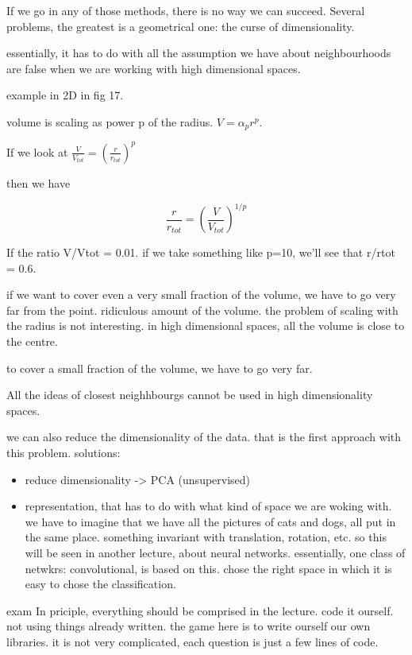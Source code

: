 \documentclass[a4paper]{tufte-book}
\begin{document}
If we go in any of those methods, there is no way we can succeed. Several
problems, the greatest is a geometrical one:
the curse of dimensionality.

essentially, it has to do with all the assumption we have about neighbourhoods
are false when we are working with high dimensional spaces.

example in 2D in fig 17.

volume is scaling as power p of the radius. $V = \alpha_p r^p$.

If we look at $\frac{V}{V_{tot}} = \left( \frac{r}{r_{tot}} \right)^p$

then we have 

\begin{equation}
    \frac{r}{r_{tot}} = \left( \frac{V}{V_{tot}} \right)^{1/p}
\end{equation}


If the ratio V/Vtot = 0.01.
if we take something like p=10, we'll see that r/rtot = 0.6.

if we want to cover even a very small fraction of the volume, we have to go very
far from the point.
ridiculous amount of the volume.
the problem of scaling with the radius is not interesting.
in high dimensional spaces, all the volume is close to the centre.

to cover a small fraction of the volume, we have to go very far.

All the ideas of closest neighhbourgs cannot be used in high dimensionality
spaces.

we can also reduce the dimensionality of the data. that is the first approach
with this problem.
solutions:
\begin{itemize}
    \item reduce dimensionality -> PCA (unsupervised)
    \item representation, that has to do with what kind of space we are woking with. we have to imagine that we have all the pictures of cats and
        dogs, all put in the same place.
        something invariant with translation, rotation, etc. so this will be seen in another lecture, about neural networks. essentially, one
        class of netwkrs: convolutional, is based on this. chose the right space
        in which it is easy to chose the classification.
\end{itemize}

exam
In priciple, everything should be comprised in the lecture.
code it ourself. not using things already written. the game here is to write
ourself our own libraries. it is not very complicated, each question is just
a few lines of code.
\end{document}
